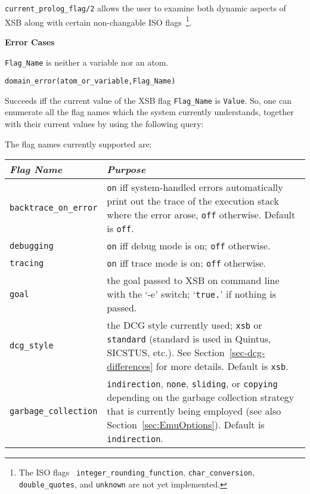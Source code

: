 \begin{description}
	{\tt current\_prolog\_flag/2} allows the user to examine both
	dynamic aspects of XSB along with certain non-changable ISO
	flags~\footnote{The ISO flags {\tt
integer\_rounding\_function}, {\tt char\_conversion}, {\tt
double\_quotes}, and {\tt unknown} are not yet implemented.}.

{\bf Error Cases}
\bi
\item 	{\tt Flag\_Name} is neither a variable nor an atom.
\bi
\item 	{\tt domain\_error(atom\_or\_variable,Flag\_Name)}
\ei
\ei

    Succeeds iff the current value of the XSB flag {\tt Flag\_Name} is 
    {\tt Value}. So, one can enumerate all the flag names which the system
    currently understands, together with their current values by using the
    following query:


    The flag names currently supported are:

    \begin{center} 
\begin{tabular}{||l|p{11cm}||} \hline 
	{\em Flag Name} & {\em Purpose} \\ \hline \hline 
	{\tt backtrace\_on\_error} & 
		{\tt on} iff system-handled errors automatically
		print out the trace of the execution stack where the
		error arose, {\tt off} otherwise. Default is {\tt off}.\\ 
		\hline
	{\tt debugging}		& 
		{\tt on} iff debug mode is on; {\tt off} otherwise.\\
		\hline
	{\tt tracing}		& 
		{\tt on} iff trace mode is on; {\tt off} otherwise.\\
		\hline
	{\tt goal}		& 
		the goal passed to XSB on command line with the `-e'
                switch; `{\tt true.}' if nothing is passed.
                \\ \hline
        {\tt dcg\_style}        &
                the DCG style currently used; {\tt xsb} or {\tt standard}
                (standard is used in Quintus, SICSTUS, etc.).
                See Section~\ref{sec-dcg-differences} for more
	    details. Default is {\tt xsb}.
	
                \\ \hline
	{\tt garbage\_collection} &
		{\tt indirection}, {\tt none}, {\tt sliding}, or {\tt copying} depending
		on the garbage collection strategy that is currently
		being employed (see also
		Section~\ref{sec:EmuOptions}).  Default is {\tt indirection}. 
                \\ \hline
    \end{tabular}
    \end{center}
    

\end{description}
